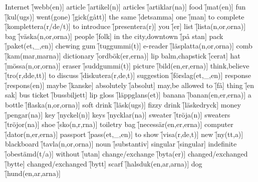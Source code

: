 \begin{questions}
\begin{multicols}{2}
        \question Internet \f[webb(en)]
        \question article \f[artikel(n)]
        \question articles \f[artiklar(na)]
        \question food \f[mat(en)]
        \question fun \f[kul(ugs)]
        \question went(gone) \f[gick(gått)]
        \question the same \f[detsamma]
        \question one \f[man]
        \question to complete \f[komplettera(r/de/t)]
        \question to introduce \f[presentera(r)]
        \question you \f[er]
        \question list \f[lista(n,or,orna)]
        \question bag \f[väska(n,or,orna)]
        \question people \f[folk]
        \question in the city,downtown \f[på stan]
        \question pack \f[paket(et,\_,en)]
        \question chewing gum \f[tuggummi(t)]
        \question e-reader \f[läsplatta(n,or,orna)]
        \question comb \f[kam(mar,marna)]
        \question dictionary \f[ordbök(er,erna)]
        \question lip balm,chapstick \f[cerat]
        \question hat \f[mössa(n,or,orna)]
        \question eraser \f[suddgummi(t)]
        \question picture \f[bild(en,er,erna)]
        \question think,believe \f[tro(r,dde,tt)]
        \question to discuss \f[diskutera(r,de,t)]
        \question suggestion \f[förslag(et,\_,en)]
        \question response \f[respons(en)]
        \question maybe \f[kanske]
        \question absolutely \f[absolut]
        \question may,be allowed to \f[få]
        \question thing \f[en sak]
        \question bus ticket \f[bussbiljett]
        \question lip gloss \f[läppglans(et)]
        \question banana \f[banan(en,er,erna)]
        \question a bottle \f[flaska(n,or,orna)]
        \question soft drink \f[läsk(ugs)]
        \question fizzy drink \f[läskedryck]
        \question money \f[pengar(na)]
        \question key \f[nyckel(n)]
        \question keys \f[nycklar(na)]
        \question sweater \f[tröja(n)]
        \question sweaters \f[tröjor(na)]
        \question shoe \f[sko(n,r,rna)]
        \question toiletry bag \f[necessär(en,er,erna)]
        \question computer \f[dator(n,er,erna)]
        \question passport \f[pass(et,\_,en)]
        \question to show \f[visa(r,de,t)]
        \question new \f[ny(tt,a)]
        \question blackboard \f[tavla(n,or,orna)]
        \question noun \f[substantiv]
        \question singular \f[singular]
        \question indefinite \f[obestämd(t/a)]
        \question without \f[utan]
        \question change/exchange \f[byta(er)]
        \question changed/exchanged \f[bytte]
        \question changed/exchanged \f[bytt]
        \question scarf \f[halsduk(en,ar,arna)]
        \question dog \f[hund(en,ar,arna)]
    \end{multicols}
\end{questions}
